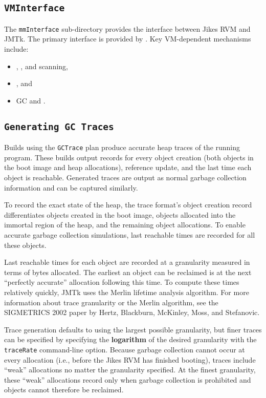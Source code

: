 \subsection{\texttt{VMInterface}} \label{sssec:vminterface}

The \texttt{mmInterface} sub-directory provides the interface between
Jikes RVM and JMTk.  The primary interface is provided by
.  Key
VM-dependent mechanisms include:

\begin{itemize}
\item {},
  , and
   scanning,
\item {}, and
\item GC  and .
\end{itemize}

\subsection{\texttt{Generating GC Traces}} \label{sssec:gctrace}
Builds using the \texttt{GCTrace} plan produce accurate heap traces of
the running program.  These builds output records for every object
creation (both objects in the boot image and heap allocations),
reference update, and the last time each object is reachable.
Generated traces are output as normal garbage collection information
and can be captured similarly.

To record the exact state of the heap, the trace format's object
creation record differentiates objects created in the boot image,
objects allocated into the immortal region of the heap, and the
remaining object allocations.  To enable accurate garbage collection
simulations, last reachable times are recorded for all these objects.

Last reachable times for each object are recorded at a granularity
measured in terms of bytes allocated.  The earliest an object can be
reclaimed is at the next ``perfectly accurate'' allocation following
this time.  To compute these times relatively quickly, JMTk uses the
Merlin lifetime analysis algorithm.  For more information about trace
granularity or the Merlin algorithm, see the SIGMETRICS 2002 paper by 
Hertz, Blackburn, McKinley, Moss, and Stefanovic.

Trace generation defaults to using the largest possible granularity,
but finer traces can be specified by specifying the \textbf{logarithm}
of the desired granularity with the \texttt{traceRate} command-line
option.  Because garbage collection cannot occur at every allocation
(i.e., before the Jikes RVM has finished booting), traces include
``weak'' allocations no matter the granularity specified.  At the
finest granularity, these ``weak'' allocations record only when
garbage collection is prohibited and objects cannot therefore be
reclaimed.


